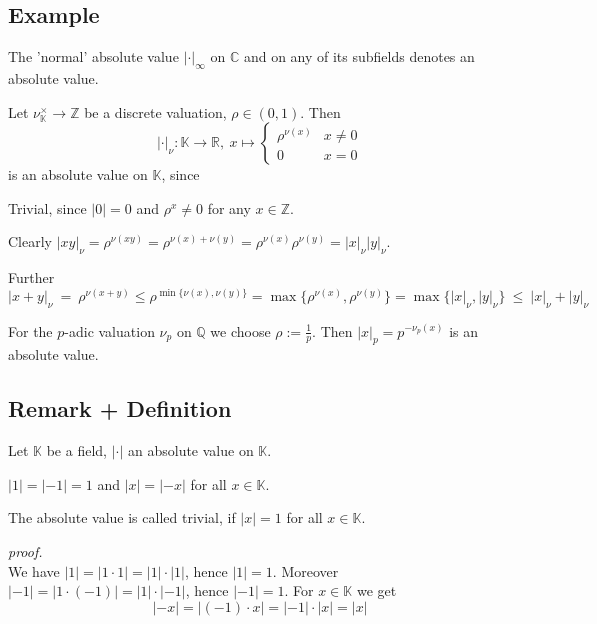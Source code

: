 \documentclass[12pt]{book}
\begin{document}
\begin{spacing}{1.3}
\subsection*{Example} %
\titleformat{\subsection}{\normalfont\normalsize\bfseries}{}{0em}{#1 \thesubsection}
\begin{compactenum}
\item The 'normal' absolute value $|\cdot|_{\infty}$ on $\mathbb{C}$ and on any of its subfields denotes an absolute value.
\item Let $\nu_\mathbb{K}^{\times} \longrightarrow \mathbb{Z}$ be a discrete valuation, $\rho \in (0,1)$. Then 
$$|\cdot |_{\nu}:\mathbb{K} \longrightarrow \mathbb{R}, \ x \mapsto \begin{cases} \rho^{\nu(x)} & x \neq 0 \\ 0 & x=0 \end{cases}$$
is an absolute value on $\mathbb{K}$, since
\begin{compactenum}
\item Trivial, since $|0|=0$ and $\rho^x \neq 0$ for any $x \in \mathbb{Z}$.
\item Clearly $|xy|_{\nu}=\rho^{\nu(xy)}=\rho^{\nu(x)+\nu(y)}=\rho^{\nu(x)} \rho^{\nu(y)}=|x|_{\nu}|y|_{\nu}$.
\item Further 
$$|x+y|_{\nu}\ = \ \rho^{\nu(x+y)} \leqslant \rho^{\min\{\nu(x), \nu(y)\}} = \max\{\rho^{\nu(x)}, \rho^{\nu(y)}\}=\max\{|x|_{\nu}, |y|_{\nu}\} \ \leqslant \  |x|_{\nu}+|y|_{\nu}$$
\end{compactenum}
\item For the $p$-adic valuation $\nu_p$ on $\mathbb{Q}$ we choose $\rho:=\frac{1}{p}$. Then $|x|_p=p^{-\nu_p(x)}$ is an absolute value.
\end{compactenum}

\subsection{Remark + Definition} %
Let $\mathbb{K}$ be a field, $|\cdot|$ an absolute value on $\mathbb{K}$. 
\begin{compactenum}
\item $|1|=|-1|=1$ and $|x|=|-x|$ for all $x \in \mathbb{K}$.
\item The absolute value is called trivial, if $|x|=1$ for all $x \in \mathbb{K}$.
\end{compactenum}
\textit{proof.}\\
We have $|1|=|1\cdot 1|=|1| \cdot |1|$, hence $|1|=1$. Moreover $|-1|=|1\cdot (-1)|=|1| \cdot |-1|$, hence $|-1|=1$.
For $x \in \mathbb{K}$ we get
$$|-x|=|(-1) \cdot x|=|-1| \cdot |x|=|x|$$


\end{spacing}
\end{document}
